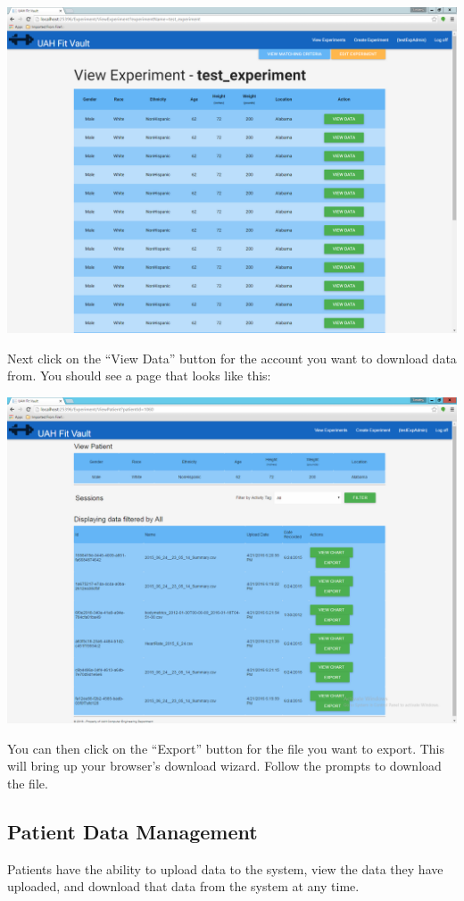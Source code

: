 \documentclass[letterpaper,10pt,english]{sphinxmanual}
\begin{document}
\includegraphics{view_experiments_expadmin_export.png}

Next click on the ``View Data'' button for the account you want to download data from. You should see a page that looks
like this:

\includegraphics{view_experiments_expadmin_export_2.png}

You can then click on the ``Export'' button for the file you want to export. This will bring up your browser's download
wizard. Follow the prompts to download the file.


\subsection{Patient Data Management}
\label{user_guide/patient_data_management:id1}\label{user_guide/patient_data_management::doc}\label{user_guide/patient_data_management:patient-data-management}
Patients have the ability to upload data to the system, view the data they have uploaded, and download that data from
the system at any time.
\end{document}
